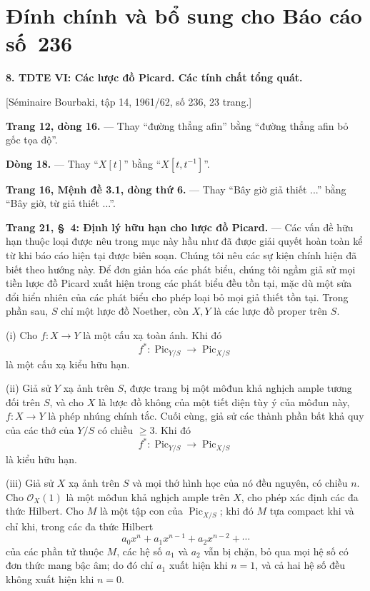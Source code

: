 \clearpage
\chapter*{Đính chính và bổ sung cho Báo cáo số~236}

\noindent\textbf{8. TDTE VI: Các lược đồ Picard. Các tính chất tổng quát.}

\begin{center}
[Séminaire Bourbaki, tập 14, 1961/62, số 236, 23 trang.]
\end{center}

\noindent\textbf{Trang 12, dòng 16.} --- Thay ``đường thẳng afin'' bằng
``đường thẳng afin bỏ gốc tọa độ''.

\noindent\textbf{Dòng 18.} --- Thay ``$X[t]$'' bằng
``$X[t,t^{-1}]$''.

\noindent\textbf{Trang 16, Mệnh đề 3.1, dòng thứ 6.} --- Thay ``Bây giờ giả
thiết ...'' bằng ``Bây giờ, từ giả thiết ...''.

\noindent\textbf{Trang 21, §~4: Định lý hữu hạn cho lược đồ Picard.} --- Các
vấn đề hữu hạn thuộc loại được nêu trong mục này hầu như đã được giải quyết
hoàn toàn kể từ khi báo cáo hiện tại được biên soạn. Chúng tôi nêu các sự kiện
chính hiện đã biết theo hướng này. Để đơn giản hóa các phát biểu, chúng tôi
ngầm giả sử mọi tiền lược đồ Picard xuất hiện trong các phát biểu đều tồn tại,
mặc dù một sửa đổi hiển nhiên của các phát biểu cho phép loại bỏ mọi giả
thiết tồn tại. Trong phần sau, $S$ chỉ một lược đồ Noether, còn $X,Y$ là các
lược đồ proper trên $S$.

\medskip
\noindent(i) Cho $f:X\longrightarrow Y$ là một cấu xạ toàn ánh. Khi đó
\[
f^*: \operatorname{Pic}_{Y/S}\longrightarrow\operatorname{Pic}_{X/S}
\]
là một cấu xạ kiểu hữu hạn.

\noindent(ii) Giả sử $Y$ xạ ảnh trên $S$, được trang bị một môđun khả nghịch
ample tương đối trên $S$, và cho $X$ là lược đồ không của một tiết diện tùy ý
của môđun này, $f:X\longrightarrow Y$ là phép nhúng chính tắc. Cuối cùng, giả
sử các thành phần bất khả quy của các thớ của $Y/S$ có chiều $\geq3$. Khi đó
\[
f^*: \operatorname{Pic}_{Y/S}\longrightarrow\operatorname{Pic}_{X/S}
\]
là kiểu hữu hạn.

\noindent(iii) Giả sử $X$ xạ ảnh trên $S$ và mọi thớ hình học của nó đều
nguyên, có chiều $n$. Cho $\mathcal O_X(1)$ là một môđun khả nghịch ample trên
$X$, cho phép xác định các đa thức Hilbert. Cho $M$ là một tập con của
$\operatorname{Pic}_{X/S}$; khi đó $M$ tựa compact khi và chỉ khi, trong các
đa thức Hilbert
\[
a_0x^n+a_1x^{n-1}+a_2x^{n-2}+\cdots
\]
của các phần tử thuộc $M$, các hệ số $a_1$ và $a_2$ vẫn bị chặn, bỏ qua mọi hệ số có đơn thức mang bậc âm; do đó chỉ $a_1$ xuất hiện khi $n=1$, và cả hai hệ số đều không xuất hiện khi $n=0$.

